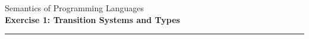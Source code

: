 \documentclass[10pt,a4paper]{exam}
\begin{document}
\newcommand{\course}{Semantics of Programming Languages}
\newcommand{\week}{1}
\newcommand{\topics}{Transition Systems and Types}

\everymath{\color{campurpledark}}
\everydisplay{\color{campurpledark}}

\vspace{-15pt}



\marksnotpoints
\pointsdroppedatright
\marksnotpoints
\marginpointname{ \points}

\begin{center}
\Large {\color{campurpledark} \course} \\[-0.2cm]
\LARGE \textbf{\color{campurpledark} Exercise \week: \topics} \\
\end{center}

{\color{campurple}\hrule}

\vspace{0.5cm}
\end{document}
